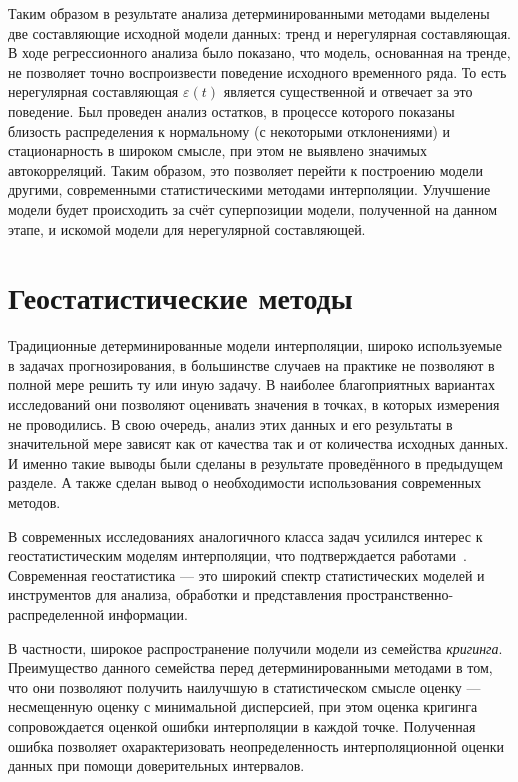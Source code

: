 Таким образом в результате анализа детерминированными методами выделены две составляющие исходной модели данных: тренд и нерегулярная составляющая. В ходе регрессионного анализа было показано, что модель, основанная на тренде, не позволяет точно воспроизвести поведение исходного временного ряда. То есть нерегулярная составляющая $ \varepsilon(t) $ является существенной и отвечает за это поведение. Был проведен анализ остатков, в процессе которого показаны близость распределения к нормальному (с некоторыми отклонениями) и стационарность в широком смысле, при этом не выявлено значимых автокорреляций. Таким образом, это позволяет перейти к построению модели другими, современными статистическими методами интерполяции. Улучшение модели будет происходить за счёт суперпозиции модели, полученной на данном этапе, и искомой модели для нерегулярной составляющей.



\section{Геостатистические методы} %
\label{sec:geostatistic}

Традиционные детерминированные модели интерполяции, широко используемые в задачах прогнозирования, в большинстве случаев на практике не позволяют в полной мере решить ту или иную задачу. В наиболее благоприятных вариантах исследований они позволяют оценивать значения в точках, в которых измерения не проводились. В свою очередь, анализ этих данных и его результаты в значительной мере зависят как от качества так и от количества исходных данных. И именно такие выводы были сделаны в результате проведённого в предыдущем разделе. А также сделан вывод о необходимости использования современных методов.

В современных исследованиях аналогичного класса задач усилился интерес к геостатистическим моделям интерполяции, что подтверждается работами~\cite{GeoStCompar1987, GeoStCompar1998}. Современная геостатистика --- это широкий спектр статистических моделей и инструментов для анализа, обработки и представления пространственно-распределенной информации.

В частности, широкое распространение получили модели из семейства \textit{кригинга}. Преимущество данного семейства перед детерминированными методами в том, что они позволяют получить наилучшую в статистическом смысле оценку  --- несмещенную оценку с минимальной дисперсией, при этом оценка кригинга сопровождается оценкой ошибки интерполяции в каждой точке. Полученная ошибка позволяет охарактеризовать неопределенность интерполяционной оценки данных при помощи доверительных интервалов.

